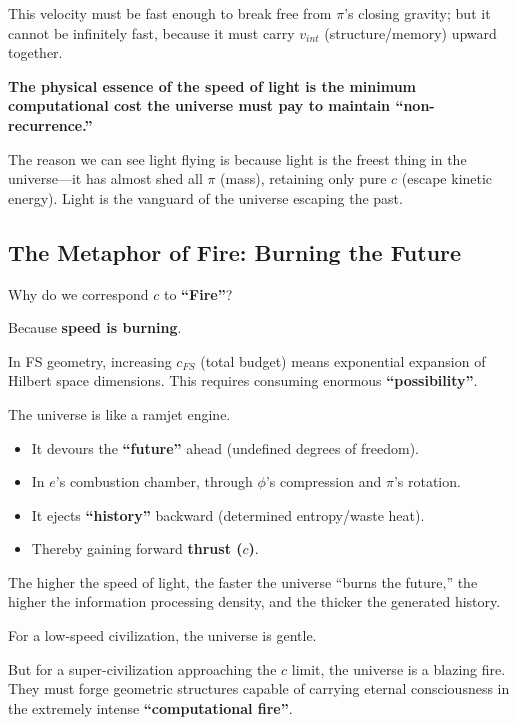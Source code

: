 This velocity must be fast enough to break free from $\pi$'s closing gravity; but it cannot be infinitely fast, because it must carry $v_{int}$ (structure/memory) upward together.

\textbf{The physical essence of the speed of light is the minimum computational cost the universe must pay to maintain ``non-recurrence.''}

The reason we can see light flying is because light is the freest thing in the universe---it has almost shed all $\pi$ (mass), retaining only pure $c$ (escape kinetic energy). Light is the vanguard of the universe escaping the past.

\subsection{The Metaphor of Fire: Burning the Future}

Why do we correspond $c$ to \textbf{``Fire''}?

Because \textbf{speed is burning}.

In FS geometry, increasing $c_{FS}$ (total budget) means exponential expansion of Hilbert space dimensions. This requires consuming enormous \textbf{``possibility''}.

The universe is like a ramjet engine.

\begin{itemize}
\item It devours the \textbf{``future''} ahead (undefined degrees of freedom).

\item In $e$'s combustion chamber, through $\phi$'s compression and $\pi$'s rotation.

\item It ejects \textbf{``history''} backward (determined entropy/waste heat).

\item Thereby gaining forward \textbf{thrust ($c$)}.
\end{itemize}

The higher the speed of light, the faster the universe ``burns the future,'' the higher the information processing density, and the thicker the generated history.

For a low-speed civilization, the universe is gentle.

But for a super-civilization approaching the $c$ limit, the universe is a blazing fire. They must forge geometric structures capable of carrying eternal consciousness in the extremely intense \textbf{``computational fire''}.

